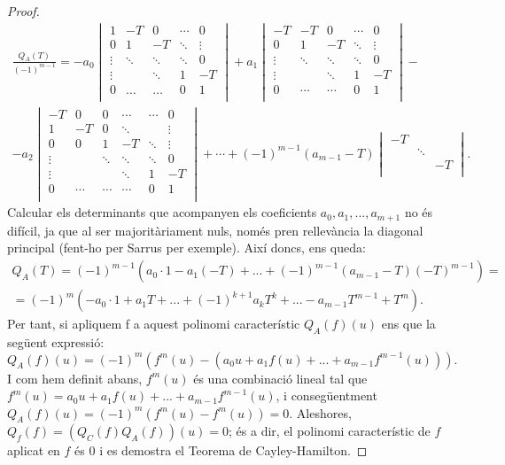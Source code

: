 \begin{proof}
\begin{gather*}
\frac{Q_A(T)}{(-1)^{m-1}} =
-a_0  
\begin{vmatrix} 
1 &-T & 0 & \cdots&0 \\ 
0 & 1 &-T & \ddots & \vdots \\ 
\vdots &\ddots &\ddots &\ddots & 0\\
\vdots & & \ddots &1 &-T \\ 
0 & \dots & \dots & 0 & 1 \\  
\end{vmatrix}
+ a_1  
\begin{vmatrix} 
-T &-T & 0 & \cdots&0 \\ 
0 & 1 &-T & \ddots & \vdots \\ 
\vdots &\ddots &\ddots &\ddots & 0\\
\vdots & & \ddots &1 &-T \\ 
0 & \cdots & \cdots & 0 & 1 \\  
\end{vmatrix} -
\\
-a_2 
\begin{vmatrix} 
-T & 0 & 0 & \cdots& \cdots& 0 \\ 
1 & -T & 0 & \ddots & & \vdots \\ 
0 & 0 & 1 &-T & \ddots & \vdots \\
\vdots & &\ddots &\ddots &\ddots & 0\\
\vdots & & & \ddots &1 &-T \\ 
0 & \cdots& \cdots &\cdots & 0 & 1 \\  
\end{vmatrix}
+ \cdots + (-1)^{m-1}(a_{m-1}-T) 
\begin{vmatrix} 
-T & & \\ 
 &\ddots & \\
& &-T \\  
\end{vmatrix}.
\end{gather*}
Calcular els determinants que acompanyen els coeficients $a_0, a_1, ..., a_{m+1}$ no és difícil, ja que al ser majoritàriament nuls, només pren rellevància la diagonal principal (fent-ho per Sarrus per exemple). Així doncs, ens queda:
\begin{gather*}
    Q_A(T) = (-1)^{m-1} \left ( a_0\cdot1 - a_1(-T) + ... + (-1)^{m-1} (a_{m-1}-T) (-T)^{m-1} \right ) = \\
    = (-1)^{m} \left ( -a_0\cdot1 + a_1 T + ... + (-1)^{k+1}a_{k}T^k + ... - a_{m-1} T^{m-1} + T^m \right ).
\end{gather*}
Per tant, si apliquem f a aquest polinomi característic $Q_A(f)(u)$ ens que la següent expressió:
\[ Q_A\left(f\right)\left(u\right) = \left(-1\right)^m \left(f^m\left(u\right) - \left(a_0 u + a_1f\left(u\right) + ... + a_{m-1}f^{m-1}\left(u\right)\right)\right). \]
I com hem definit abans, $f^m(u)$ és una combinació lineal tal que $f^m(u) = a_0 u + a_1f(u) + ... + a_{m-1}f^{m-1}(u)$, i consegüentment $Q_A(f)(u) = (-1)^m(f^m(u) - f^m(u)) = 0$. Aleshores, $Q_f(f) = (Q_C(f) Q_A(f))(u) = 0$; és a dir, el polinomi característic de $f$ aplicat en $f$ és 0 i es demostra el Teorema de Cayley-Hamilton.
\end{proof}


